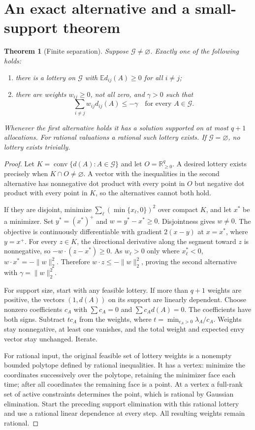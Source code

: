\documentclass[11pt]{article}
\newtheorem{theorem}{Theorem}
\theoremstyle{definition}
\newcommand{\R}{\mathbb R}
\newcommand{\E}{\mathbb E}
\DeclareMathOperator{\conv}{conv}
\begin{document}
\section{An exact alternative and a small-support theorem}
\begin{theorem}[Finite separation]\label{alternative}
Suppose $\mathcal G\ne\varnothing$. Exactly one of the following holds:
\begin{enumerate}
\item there is a lottery on $\mathcal G$ with $\E d_{ij}(A)\ge0$ for all $i\ne j$;
\item there are weights $w_{ij}\ge0$, not all zero, and $\gamma>0$ such that
\[
 \sum_{i\ne j}w_{ij}d_{ij}(A)\le-\gamma
 \quad\text{for every }A\in\mathcal G.
\]
\end{enumerate}
Whenever the first alternative holds it has a solution supported on at
most $q+1$ allocations. For rational valuations a rational such lottery
exists. If $\mathcal G=\varnothing$, no lottery exists trivially.
\end{theorem}
\begin{proof}
Let $K=\conv\{d(A):A\in\mathcal G\}$ and let $O=\R^q_{\ge0}$.
A desired lottery exists precisely when $K\cap O\ne\varnothing$.
A vector with the inequalities in the second alternative has nonnegative
dot product with every point in $O$ but negative dot product with every
point in $K$, so the alternatives cannot both hold.

If they are disjoint, minimize $\sum_\ell(\min\{x_\ell,0\})^2$ over
compact $K$, and let $x^*$ be a minimizer. Set $y^*=(x^*)^+$ and
$w=y^*-x^*\ge0$. Disjointness gives $w\ne0$. The objective is continuously
differentiable with gradient $2(x-y)$ at $x=x^*$, where $y=x^+$.
For every $z\in K$, the directional derivative along the segment toward
$z$ is nonnegative, so
$-w\cdot(z-x^*)\ge0$. As $w_\ell>0$ only where $x^*_\ell<0$,
$w\cdot x^*=-\|w\|_2^2$. Therefore
$w\cdot z\le-\|w\|_2^2$, proving the second alternative with
$\gamma=\|w\|_2^2$.

For support size, start with any feasible lottery. If more than $q+1$
weights are positive, the vectors $(1,d(A))$ on its support are linearly
dependent. Choose nonzero coefficients $c_A$ with $\sum c_A=0$ and
$\sum c_A d(A)=0$. The coefficients have both signs. Subtract
$t c_A$ from the weights, where $t=\min_{c_A>0}\lambda_A/c_A$.
Weights stay nonnegative, at least one vanishes, and the total weight and
expected envy vector stay unchanged. Iterate.

For rational input, the original feasible set of lottery weights is a
nonempty bounded polytope defined by rational inequalities. It has a
vertex: minimize the coordinates successively over the polytope, retaining
the minimizer face each time; after all coordinates the remaining face is
a point. At a vertex a full-rank set of active constraints determines the
point, which is rational by Gaussian elimination. Start the preceding
support elimination with this rational lottery and use a rational linear
dependence at every step. All resulting weights remain rational.
\end{proof}
\end{document}
